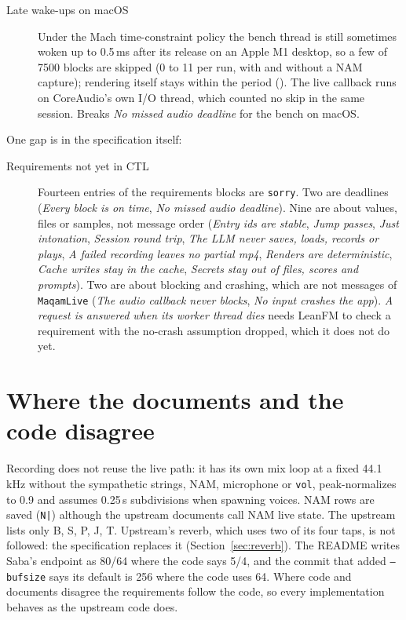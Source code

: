 \documentclass[11pt,oneside]{book}
\newcommand{\cmd}[1]{\texttt{#1}}
\begin{document}
\begin{description}
  \item[Late wake-ups on macOS] Under the Mach time-constraint policy the bench
  thread is still sometimes woken up to 0.5\,ms after its release on an Apple M1
  desktop, so a few of 7500 blocks are skipped (0 to 11 per run, with and without
  a NAM capture); rendering itself stays within the period
  (). The live callback runs on
  CoreAudio's own I/O thread, which counted no skip in the same session. Breaks
  \emph{No missed audio deadline} for the bench on macOS.
\end{description}

\noindent One gap is in the specification itself:

\begin{description}
  \item[Requirements not yet in CTL] Fourteen entries of the requirements
  blocks are \texttt{sorry}. Two are deadlines (\emph{Every block is on time},
  \emph{No missed audio deadline}). Nine are about values, files or samples,
  not message order (\emph{Entry ids are stable}, \emph{Jump passes},
  \emph{Just intonation}, \emph{Session round trip}, \emph{The LLM never saves,
  loads, records or plays}, \emph{A failed recording leaves no partial mp4},
  \emph{Renders are deterministic}, \emph{Cache writes stay in the cache},
  \emph{Secrets stay out of files, scores and prompts}). Two are about
  blocking and crashing, which are not messages of \texttt{MaqamLive}
  (\emph{The audio callback never blocks}, \emph{No input crashes the app}).
  \emph{A request is answered when its worker thread dies} needs LeanFM to
  check a requirement with the no-crash assumption dropped, which it does not
  do yet.
\end{description}

\chapter{Where the documents and the code disagree}
Recording does not reuse the live path: it has its own mix loop at a fixed
44.1\,kHz without the sympathetic strings, NAM, microphone or \cmd{vol},
peak-normalizes to 0.9 and assumes 0.25\,s subdivisions when spawning voices.
NAM rows are saved (\texttt{N|}) although the upstream documents call NAM live
state. The upstream  lists only B, S, P, J, T. Upstream's
reverb, which uses two of its four taps, is not followed: the specification
replaces it (Section~\ref{sec:reverb}). The README writes Saba's endpoint as 80/64
where the code says 5/4, and the commit that added \cmd{--bufsize} says its
default is 256 where the code uses 64. Where code and documents disagree the requirements follow the
code, so every implementation behaves as the upstream code does.
\end{document}

